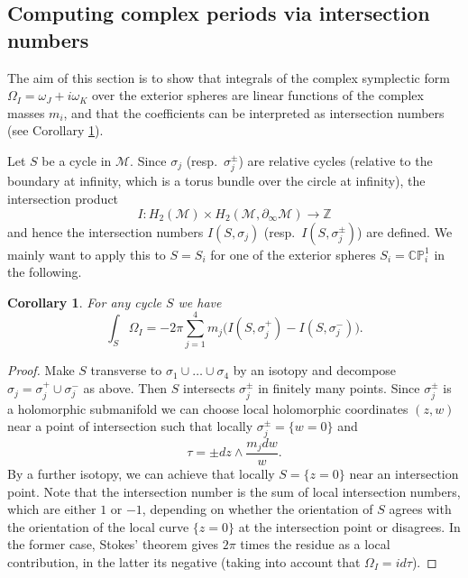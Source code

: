 \documentclass[12pt,letterpaper,reqno]{amsart}
\newtheorem{cor}[thm]{Corollary}
\theoremstyle{remark}
\theoremstyle{definition}
\numberwithin{thm}{section}
\numberwithin{equation}{section}
\numberwithin{figure}{section}
\newcommand{\CP}{\ensuremath{\mathbb {CP}}}
\newcommand{\Z}{\ensuremath{\mathbb Z}}
\begin{document}
\subsection{Computing complex periods via intersection numbers}\label{sec:intersectionnumbers}
The aim of this section is to show that integrals of the complex symplectic form $\Omega_I = \omega_J + i \omega_K$ over the exterior spheres are linear functions of the complex masses $m_i$, and that the coefficients can be interpreted as intersection numbers (see Corollary \ref{cor:intersectionnumbers}). 

Let $S$ be a cycle in $\mathcal M$. Since $\sigma_j$ (resp.\ $\sigma_j^\pm$) are relative cycles (relative to the boundary at infinity, which is a torus bundle over the circle at infinity), the intersection product
\[
I : H_2(\mathcal{M}) \times H_2(\mathcal{M},\partial_\infty \mathcal{M}) \to \Z
\]
and hence the intersection numbers $I(S,\sigma_j)$ (resp.\ $I(S,\sigma_j^\pm)$) are defined. 
We mainly want to apply this to $S=S_i$ for one of the exterior spheres $S_i=\CP^1_i$ in the following.
\begin{cor}\label{cor:intersectionnumbers}
For any cycle $S$ we have
\[	
\int_{S} \Omega_I =  -2 \pi  \sum_{j=1}^4 m_j \bigl( I(S,\sigma_j^+)- I(S,\sigma_j^-) \bigr).
\]
\end{cor}

\begin{proof}
Make $S$ transverse to $\sigma_1 \cup \ldots \cup \sigma_4$ by an isotopy and decompose $\sigma_j = \sigma_j^+ \cup \sigma_j^-$ as above. Then $S$ intersects $\sigma_j^\pm$ in finitely many points. Since $\sigma_j^{\pm}$ is a holomorphic submanifold we can choose local holomorphic coordinates $(z,w)$ near a point of intersection such that locally $\sigma_j^{\pm} = \{ w=0\}$ and
\[
\tau = \pm dz \wedge \frac{ m_j dw}{w}.
\]
By a further isotopy, we can achieve that locally $S = \{z=0\}$ near an intersection point. Note that the intersection number is the sum of local intersection numbers, which are either $1$ or $-1$, depending on whether the orientation of $S$ agrees with the orientation of the local curve $\{z=0\}$ at the intersection point or disagrees. In the former case, Stokes' theorem gives $2 \pi $ times the residue as a local contribution, in the latter its negative (taking into account that $\Omega_I = i d \tau$).
\end{proof}
\end{document}
